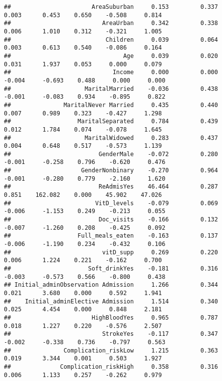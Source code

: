 \documentclass[
]{article}
\begin{document}
\begin{verbatim}
##                       AreaSuburban     0.153         0.337        0.003      0.453    0.650    -0.508     0.814 
##                          AreaUrban     0.342         0.338        0.006      1.010    0.312    -0.321     1.005 
##                           Children     0.039         0.064        0.003      0.613    0.540    -0.086     0.164 
##                                Age     0.039         0.020        0.031      1.937    0.053     0.000     0.079 
##                             Income     0.000         0.000       -0.004     -0.693    0.488     0.000     0.000 
##                     MaritalMarried    -0.036         0.438       -0.001     -0.083    0.934    -0.895     0.822 
##               MaritalNever Married     0.435         0.440        0.007      0.989    0.323    -0.427     1.298 
##                   MaritalSeparated     0.784         0.439        0.012      1.784    0.074    -0.078     1.645 
##                     MaritalWidowed     0.283         0.437        0.004      0.648    0.517    -0.573     1.139 
##                         GenderMale    -0.072         0.280       -0.001     -0.258    0.796    -0.620     0.476 
##                    GenderNonbinary    -0.270         0.964       -0.001     -0.280    0.779    -2.160     1.620 
##                         ReAdmisYes    46.464         0.287        0.851    162.082    0.000    45.902    47.026 
##                        VitD_levels    -0.079         0.069       -0.006     -1.153    0.249    -0.213     0.055 
##                         Doc_visits    -0.166         0.132       -0.007     -1.260    0.208    -0.425     0.092 
##                   Full_meals_eaten    -0.163         0.137       -0.006     -1.190    0.234    -0.432     0.106 
##                          vitD_supp     0.269         0.220        0.006      1.224    0.221    -0.162     0.700 
##                      Soft_drinkYes    -0.181         0.316       -0.003     -0.573    0.566    -0.800     0.438 
## Initial_adminObservation Admission     1.266         0.344        0.021      3.680    0.000     0.592     1.941 
##    Initial_adminElective Admission     1.514         0.340        0.025      4.454    0.000     0.848     2.181 
##                       HighBloodYes     0.965         0.787        0.018      1.227    0.220    -0.576     2.507 
##                          StrokeYes    -0.117         0.347       -0.002     -0.338    0.736    -0.797     0.563 
##               Complication_riskLow     1.215         0.363        0.019      3.344    0.001     0.503     1.927 
##              Complication_riskHigh     0.358         0.316        0.006      1.133    0.257    -0.262     0.979 

\end{verbatim}
\end{document}
